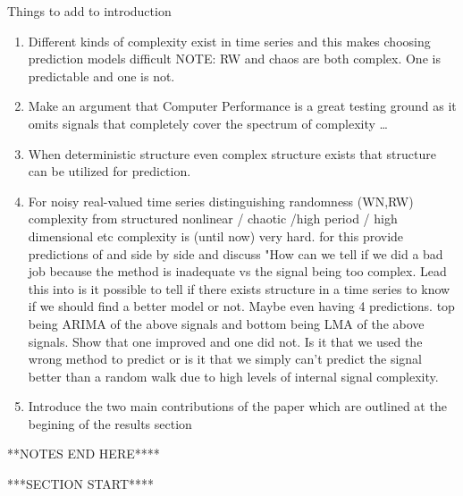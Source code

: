 Things to add to introduction
\begin{enumerate}
\item Different kinds of complexity exist in time series and this makes choosing prediction models difficult 
\subitem NOTE: RW and chaos are both complex. One is predictable and one is not.

\item Make an argument that Computer Performance is a great testing ground as it omits signals that completely cover the spectrum of complexity \col \dots \gcc

\item When deterministic structure even complex structure exists that structure can be utilized for prediction. 
\item For noisy real-valued time series distinguishing randomness (WN,RW) complexity from structured nonlinear / chaotic /high period / high dimensional etc complexity is (until now) very hard. 
\subitem for this provide predictions of \gcc and \col side by side and discuss "How can we tell if we did a bad job because the method is inadequate vs the signal being too complex. Lead this into is it possible to tell if there exists structure in a time series to know if we should find a better model or not. Maybe even having 4 predictions. top being ARIMA of the above signals and bottom being LMA of the above signals. Show that one improved and one did not. Is it that we used the wrong method to predict or is it that we simply can't predict the signal better than a random walk due to high levels of internal signal complexity.



\item Introduce the two main contributions of the paper which are outlined at the begining of the results section

\end{enumerate}
\noindent ***NOTES END HERE****

\noindent ****SECTION START****



